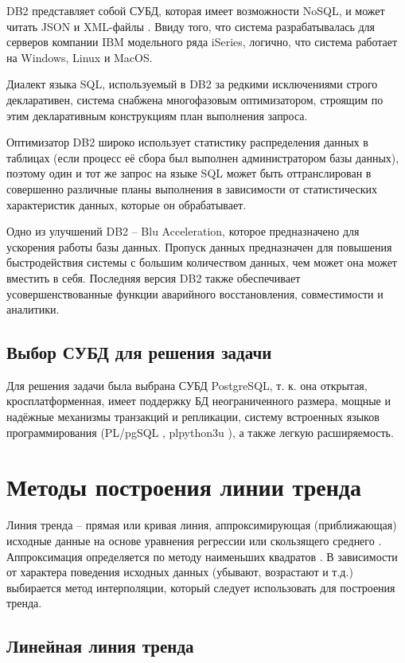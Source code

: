 \documentclass[a4paper,14pt]{extreport}
\begin{document}
DB2 представляет собой СУБД, которая имеет возможности NoSQL, и может читать JSON и XML-файлы  \cite{cmp_db}. Ввиду того, что система разрабатывалась для серверов компании IBM модельного ряда iSeries, логично, что система работает на Windows, Linux и MacOS.

Диалект языка SQL, используемый в DB2 за редкими исключениями строго декларативен, система снабжена многофазовым оптимизатором, строящим по этим декларативным конструкциям план выполнения запроса.

Оптимизатор DB2 широко использует статистику распределения данных в таблицах (если процесс её сбора был выполнен администратором базы данных), поэтому один и тот же запрос на языке SQL может быть оттранслирован в совершенно различные планы выполнения в зависимости от статистических характеристик данных, которые он обрабатывает.

Одно из улучшений DB2 -- Blu Acceleration, которое предназначено для ускорения работы базы данных. Пропуск данных предназначен для повышения быстродействия системы с большим количеством данных, чем может она может вместить в себя. Последняя версия DB2 также обеспечивает усовершенствованные функции аварийного восстановления, совместимости и аналитики.

\subsection{Выбор СУБД для решения задачи}

Для решения задачи была выбрана СУБД PostgreSQL, т. к. она открытая, кросплатформенная, имеет поддержку БД неограниченного размера, мощные и надёжные механизмы транзакций и репликации, систему встроенных языков программирования (PL/pgSQL \cite{plpgsql}, plpython3u \cite{plpython3u}), а также легкую расширяемость.

\section{Методы построения линии тренда}

Линия тренда -- прямая или кривая линия, аппроксимирующая (приближающая) исходные данные на основе уравнения регрессии или скользящего среднего \cite{lt_exel}. Аппроксимация определяется по ме­тоду наименьших квадратов \cite{mnk}. В зависимости от характера поведения исходных данных (убыва­ют, возрастают и т.д.) выбирается метод интерполяции, который сле­дует использовать для построения тренда.

\subsection{Линейная линия тренда}
\end{document}
